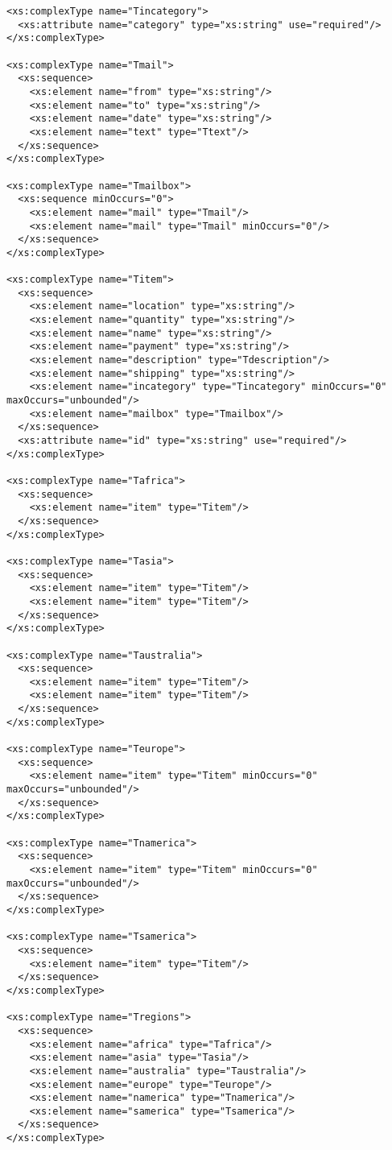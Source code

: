 \begin{lstlisting}[caption=Resulting XSD of Test Scenario B, frame=single, label=listing_xsd]
<xs:complexType name="Tincategory">
  <xs:attribute name="category" type="xs:string" use="required"/>
</xs:complexType>

<xs:complexType name="Tmail">
  <xs:sequence>
    <xs:element name="from" type="xs:string"/>
    <xs:element name="to" type="xs:string"/>
    <xs:element name="date" type="xs:string"/>
    <xs:element name="text" type="Ttext"/>
  </xs:sequence>
</xs:complexType>

<xs:complexType name="Tmailbox">
  <xs:sequence minOccurs="0">
    <xs:element name="mail" type="Tmail"/>
    <xs:element name="mail" type="Tmail" minOccurs="0"/>
  </xs:sequence>
</xs:complexType>

<xs:complexType name="Titem">
  <xs:sequence>
    <xs:element name="location" type="xs:string"/>
    <xs:element name="quantity" type="xs:string"/>
    <xs:element name="name" type="xs:string"/>
    <xs:element name="payment" type="xs:string"/>
    <xs:element name="description" type="Tdescription"/>
    <xs:element name="shipping" type="xs:string"/>
    <xs:element name="incategory" type="Tincategory" minOccurs="0" maxOccurs="unbounded"/>
    <xs:element name="mailbox" type="Tmailbox"/>
  </xs:sequence>
  <xs:attribute name="id" type="xs:string" use="required"/>
</xs:complexType>

<xs:complexType name="Tafrica">
  <xs:sequence>
    <xs:element name="item" type="Titem"/>
  </xs:sequence>
</xs:complexType>

<xs:complexType name="Tasia">
  <xs:sequence>
    <xs:element name="item" type="Titem"/>
    <xs:element name="item" type="Titem"/>
  </xs:sequence>
</xs:complexType>

<xs:complexType name="Taustralia">
  <xs:sequence>
    <xs:element name="item" type="Titem"/>
    <xs:element name="item" type="Titem"/>
  </xs:sequence>
</xs:complexType>

<xs:complexType name="Teurope">
  <xs:sequence>
    <xs:element name="item" type="Titem" minOccurs="0" maxOccurs="unbounded"/>
  </xs:sequence>
</xs:complexType>

<xs:complexType name="Tnamerica">
  <xs:sequence>
    <xs:element name="item" type="Titem" minOccurs="0" maxOccurs="unbounded"/>
  </xs:sequence>
</xs:complexType>

<xs:complexType name="Tsamerica">
  <xs:sequence>
    <xs:element name="item" type="Titem"/>
  </xs:sequence>
</xs:complexType>

<xs:complexType name="Tregions">
  <xs:sequence>
    <xs:element name="africa" type="Tafrica"/>
    <xs:element name="asia" type="Tasia"/>
    <xs:element name="australia" type="Taustralia"/>
    <xs:element name="europe" type="Teurope"/>
    <xs:element name="namerica" type="Tnamerica"/>
    <xs:element name="samerica" type="Tsamerica"/>
  </xs:sequence>
</xs:complexType>


\end{lstlisting}

